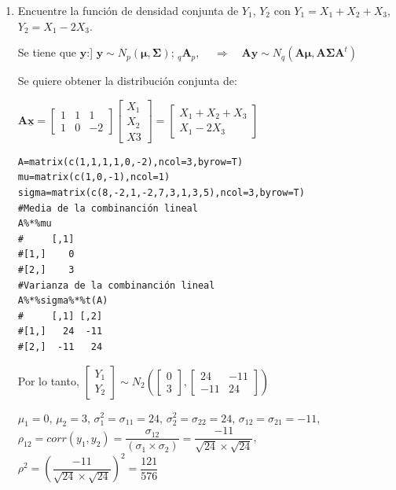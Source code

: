 \documentclass[12pt,a4paper]{report}
\begin{document}
\begin{enumerate}
\begin{enumerate}
$\therefore\quad X_1\Big|\begin{matrix}X_2 \\ X_3\end{matrix} \sim N(1.5-0.5X_2+0.5X_3,6.5)$



\item Encuentre la función de densidad conjunta de $Y_1$, $Y_2$ con $Y_1 = X_1 + X_2 + X_3$, $Y_2 = X_1 - 2X_3$. 

Se tiene que $\mathbf{y}$:]
$\mathbf{y}\sim N_p(\boldsymbol{\mu},\boldsymbol{\Sigma})$; $_q\mathbf{A}_p$, $\quad \Rightarrow \quad \mathbf{A}\mathbf{y} \sim N_q(\mathbf{A}\boldsymbol{\mu},\mathbf{A}\boldsymbol{\Sigma}\mathbf{A}^t)$

Se quiere obtener la distribución conjunta de:

$\mathbf{A\underline{x}}=\begin{bmatrix} 1 & 1 & 1 \\ 1 & 0 & -2\end{bmatrix}\begin{bmatrix} X_1 \\ X_2 \\ X3 \end{bmatrix}=\begin{bmatrix} X_1+X_2+X_3 \\ X_1 -2X_3\end{bmatrix}$

\begin{verbatim}
A=matrix(c(1,1,1,1,0,-2),ncol=3,byrow=T)
mu=matrix(c(1,0,-1),ncol=1)
sigma=matrix(c(8,-2,1,-2,7,3,1,3,5),ncol=3,byrow=T)
#Media de la combinanción lineal
A%*%mu
#     [,1]
#[1,]    0
#[2,]    3
#Varianza de la combinanción lineal
A%*%sigma%*%t(A)
#     [,1] [,2]
#[1,]   24  -11
#[2,]  -11   24
\end{verbatim}

Por lo tanto, $\begin{bmatrix} Y_1 \\ Y_2 \end{bmatrix} \sim N_2 \left( \begin{bmatrix} 0\\ 3 \end{bmatrix},\begin{bmatrix} 24 & -11\\ -11 & 24 \end{bmatrix} \right)$


$\mu_1=0$, $\mu_2=3$, $\sigma_1^2 = \sigma_{11}=24$, $\sigma_2^2 = \sigma_{22}=24$, $\sigma_{12} = \sigma_{21}=-11$, $\rho_{12} = corr(y_1, y_2) = \dfrac{\sigma_{12}}{(\sigma_1 \times \sigma_2)}=\dfrac{-11}{\sqrt{24}\times\sqrt{24}}$, $\rho^2 =\left(\dfrac{-11}{\sqrt{24}\times\sqrt{24}}\right)^2=\dfrac{121}{576}$\\


\end{enumerate}
\end{enumerate}
\end{document}
